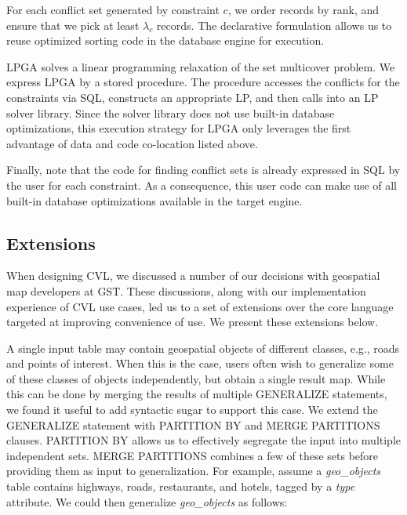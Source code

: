 For each conflict set generated by constraint $c$, we order records by rank, and ensure that we pick at least $\lambda_c$ records. The declarative formulation allows us to reuse optimized sorting code in the database engine for execution.


LPGA solves a linear programming relaxation of the set multicover problem. We express LPGA by a stored procedure. The procedure accesses the conflicts for the constraints via SQL, constructs an appropriate LP, and then calls into an LP solver library. Since the solver library does not use built-in database optimizations, this execution strategy for LPGA only leverages the first advantage of data and code co-location listed above.


Finally, note that the code for finding conflict sets is already expressed in SQL by the user for each constraint. As a consequence, this user code can make use of all built-in database optimizations available in the target engine.

\subsection{Extensions}
\label{sec:implementation:extensions}

When designing CVL, we discussed a number of our decisions with geospatial map developers at GST. These discussions, along with our implementation experience of CVL use cases, led us to a set of extensions over the core language targeted at improving convenience of use. We present these extensions below.

A single input table may contain geospatial objects of different classes, e.g., roads and points of interest. When this is the case, users often wish to generalize some of these classes of objects independently, but obtain a single result map. While this can be done by merging the results of multiple GENERALIZE statements, we found it useful to add syntactic sugar to support this case. We extend the GENERALIZE statement with PARTITION BY and MERGE PARTITIONS clauses. PARTITION BY allows us to effectively segregate the input into multiple independent sets. MERGE PARTITIONS combines a few of these sets before providing them as input to generalization. For example, assume a \emph{geo\_objects} table contains highways, roads, restaurants, and hotels, tagged by a \emph{type} attribute. We could then generalize \emph{geo\_objects} as follows:

